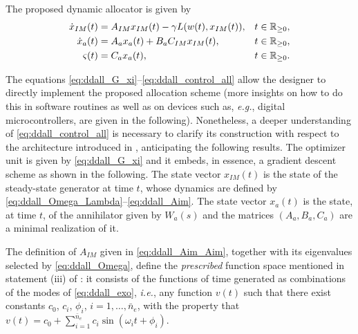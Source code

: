 The proposed dynamic allocator is given by
\begin{subequations}
  \label{eq:ddall_control_all}
	\begin{align}
		\dot{x}_{IM}(t) & = A_{IM}x_{IM}(t) - \gamma L(w(t),x_{IM}(t)), & t\in\mathbb{R}_{\geq 0}, \label{eq:ddall_control_all_xim} \\
		\dot{x}_a(t)    & = A_a x_a(t) + B_a C_{IM} x_{IM}(t), & t\in\mathbb{R}_{\geq 0}, \label{eq:ddall_control_all_xa}                  \\
		\varsigma(t)      & = C_a x_a(t), & t\in\mathbb{R}_{\geq 0}. \label{eq:ddall_control_all_ya}
	\end{align}
\end{subequations}

\begin{remark}
  \label{rem:ddall_structure}
  The equations \eqref{eq:ddall_G_xi}--\eqref{eq:ddall_control_all} allow the designer to directly implement the proposed allocation scheme (more insights on how to do this in software routines as well as on devices such as, \emph{e.g.}, digital microcontrollers, are given in the following). Nonetheless, a deeper understanding of \eqref{eq:ddall_control_all} is necessary to clarify its construction with respect to the architecture introduced in \cite{cristofaro_output_2014}, anticipating the following results. The optimizer unit is given by \eqref{eq:ddall_G_xi} and it embeds, in essence, a gradient descent scheme as shown in the following. The state vector $x_{IM}(t)$ is the state of the steady-state generator at time $t$, whose dynamics are defined by \eqref{eq:ddall_Omega_Lambda}--\eqref{eq:ddall_Aim}. The state vector $x_a(t)$ is the state, at time $t$, of the annihilator given by $W_a(s)$ and the matrices $(A_a,B_a,C_a)$ are a minimal realization of it.\closeremark
\end{remark}

\begin{remark}
  \label{rem:ddall_Aim}
	The definition of $A_{IM}$ given in \eqref{eq:ddall_Aim_Aim}, together with its eigenvalues selected by \eqref{eq:ddall_Omega}, define the \emph{prescribed} function space mentioned in statement (iii) of : it consists of the functions of time generated as combinations of the modes of \eqref{eq:ddall_exo}, \emph{i.e.}, any function	$v(t)$ such that there exist constants $c_0$, $c_i$, $\phi_i$, $i = 1, \dotsc, \bar{n}_e$, with the property that $v(t) = c_0+\sum_{i = 1}^{\bar{n}_e}c_i \sin(\omega_i t + \phi_i)$.\closeremark
\end{remark}

